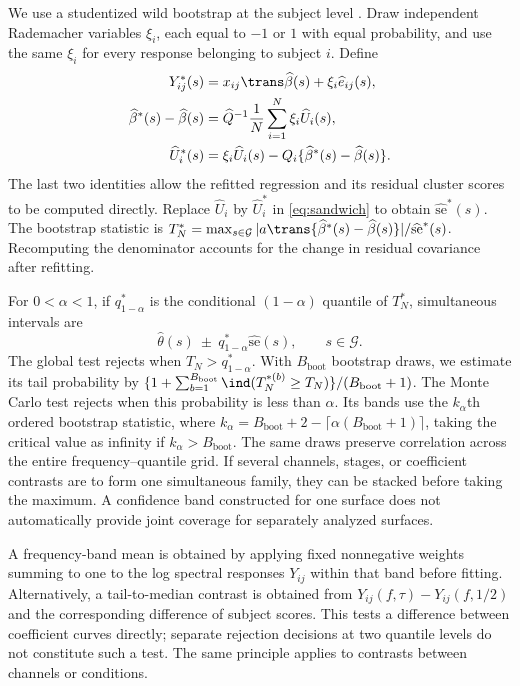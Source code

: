 We use a studentized wild bootstrap at the subject level \citep{Mammen1993,Cameron2008}. Draw independent Rademacher variables $\xi_i$, each equal to $-1$ or $1$ with equal probability, and use the same $\xi_i$ for every response belonging to subject $i$. Define
\begin{equation}\label{eq:wild}
 \begin{split}
 Y^*_{ij}(s)&=x_{ij}\trans\widehat\beta(s)+\xi_i\widehat e_{ij}(s),\\
 \widehat\beta^*(s)-\widehat\beta(s)
 &=\widehat Q^{-1}\frac1N\sum_{i=1}^N\xi_i\widehat U_i(s),\\
 \widehat U_i^*(s)
 &=\xi_i\widehat U_i(s)-Q_i\{\widehat\beta^*(s)-\widehat\beta(s)\}.
 \end{split}
\end{equation}
The last two identities allow the refitted regression and its residual cluster scores to be computed directly. Replace $\widehat U_i$ by $\widehat U_i^*$ in \eqref{eq:sandwich} to obtain $\widehat{\mathrm{se}}^*(s)$. The bootstrap statistic is $T_N^*=\max_{s\in\mathcal G}|a\trans\{\widehat\beta^*(s)-\widehat\beta(s)\}|/\widehat{\mathrm{se}}^*(s)$. Recomputing the denominator accounts for the change in residual covariance after refitting.

For $0<\alpha<1$, if $q^*_{1-\alpha}$ is the conditional $(1-\alpha)$ quantile of $T_N^*$, simultaneous intervals are
\begin{equation}\label{eq:band}
 \widehat\theta(s)\ \pm\ q^*_{1-\alpha}\widehat{\mathrm{se}}(s),
 \qquad s\in\mathcal G.
\end{equation}
The global test rejects when $T_N>q^*_{1-\alpha}$. With $B_{\mathrm{boot}}$ bootstrap draws, we estimate its tail probability by $\{1+\sum_{b=1}^{B_{\mathrm{boot}}}\ind(T_N^{*(b)}\geq T_N)\}/(B_{\mathrm{boot}}+1)$. The Monte Carlo test rejects when this probability is less than $\alpha$. Its bands use the $k_\alpha$th ordered bootstrap statistic, where $k_\alpha=B_{\mathrm{boot}}+2-\lceil\alpha(B_{\mathrm{boot}}+1)\rceil$, taking the critical value as infinity if $k_\alpha>B_{\mathrm{boot}}$. The same draws preserve correlation across the entire frequency--quantile grid. If several channels, stages, or coefficient contrasts are to form one simultaneous family, they can be stacked before taking the maximum. A confidence band constructed for one surface does not automatically provide joint coverage for separately analyzed surfaces.

A frequency-band mean is obtained by applying fixed nonnegative weights summing to one to the log spectral responses $Y_{ij}$ within that band before fitting. Alternatively, a tail-to-median contrast is obtained from $Y_{ij}(f,\tau)-Y_{ij}(f,1/2)$ and the corresponding difference of subject scores. This tests a difference between coefficient curves directly; separate rejection decisions at two quantile levels do not constitute such a test. The same principle applies to contrasts between channels or conditions.
